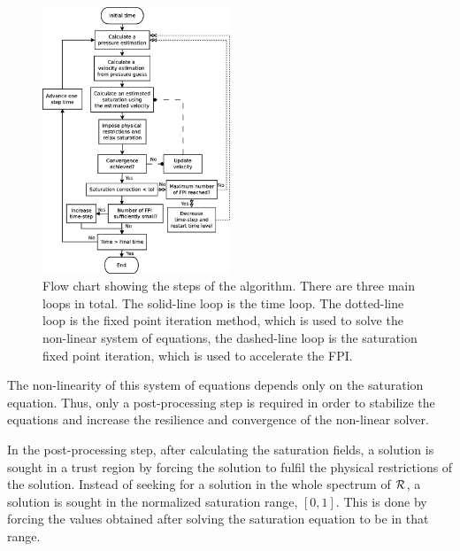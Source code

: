 \begin{figure}[h!]
  \begin{center}
    \includegraphics[width=0.50\textwidth]{figures/high_courant.png}
    \caption{Flow chart showing the steps of the algorithm. There are three main loops in total. The solid-line loop is the time loop. The dotted-line loop is the fixed point iteration method, which is used to solve the non-linear system of equations, the dashed-line loop is the saturation fixed point iteration, which is used to accelerate the FPI. \label{fig:flow_chart}}
  \end{center}
\end{figure}

The non-linearity of this system of equations depends only on the saturation equation. Thus, only a post-processing step is required in order to stabilize the equations and increase the resilience and convergence of the non-linear solver.

In the post-processing step, after calculating the saturation fields, a solution is sought in a trust region by forcing the solution to fulfil the physical restrictions of the solution. Instead of seeking for a solution in the whole spectrum of $\cal R$, a solution is sought in the normalized saturation range, $[0,1]$. This is done by forcing the values obtained after solving the saturation equation to be in that range.

